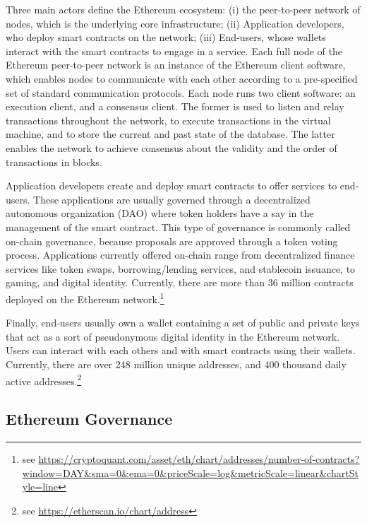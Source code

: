 \documentclass[No]{AEA}
\begin{document}
Three main actors define the Ethereum ecosystem: (i) the peer-to-peer network of nodes, which is the underlying core infrastructure; (ii) Application developers, who deploy smart contracts on the network; (iii) End-users, whose wallets interact with the smart contracts to engage in a service.     
Each full node of the Ethereum peer-to-peer network is an instance of the Ethereum client software, which enables nodes to communicate with each  other according to a pre-specified set of standard communication protocols. Each node runs two client software: an execution client, and a consensus client. The former is used to listen and relay transactions throughout the network, to execute transactions in the virtual machine, and to store the current and past state of the database. The latter enables the network to achieve consensus about the validity and the order of transactions in blocks. 

Application developers create and deploy smart contracts to offer services to end-users. These applications are usually governed through a decentralized autonomous organization (DAO) where token holders have a say in the management of the smart contract. This type of governance is commonly called on-chain governance, because proposals are approved through a token voting process. Applications currently offered on-chain range from decentralized finance services like token swaps, borrowing/lending services, and stablecoin issuance, to gaming, and digital identity. Currently, there are more than 36 million contracts deployed on the Ethereum network.\footnote{see \url{https://cryptoquant.com/asset/eth/chart/addresses/number-of-contracts?window=DAY&sma=0&ema=0&priceScale=log&metricScale=linear&chartStyle=line}}

Finally, end-users usually own a wallet containing a set of public and private keys that act as a sort of pseudonymous digital identity in the Ethereum network. Users can interact with each others and with smart contracts using their wallets. Currently, there are over 248 million unique addresses, and 400 thousand daily active addresses.\footnote{see \url{https://etherscan.io/chart/address}}

\subsection{Ethereum Governance} \label{subsec_eth_gov}
\end{document}
